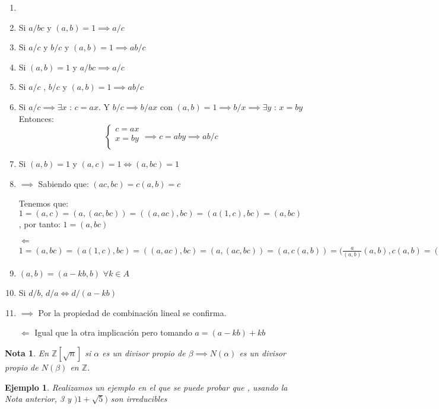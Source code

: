 \documentclass[11pt, a4paper, titlepage]{article}
\makeatletter
\renewenvironment{proof}[1][\proofname] {\vspace{-15pt}\par\pushQED{\qed}\normalfont\topsep6\p@\@plus6\p@\relax\trivlist\item[\hskip\labelsep\it#1\@addpunct{.}]\ignorespaces}{\popQED\endtrivlist\@endpefalse}
\theoremstyle{theorem-style}
\theoremstyle{definition-style}
\theoremstyle{remark-style}
\newtheorem*{nota}{Nota}
\theoremstyle{example-style}
\newtheorem*{ejemplo}{Ejemplo}
\newenvironment{nlist}
{\begin{enumerate}
\renewcommand\labelenumi{(\emph{\roman{enumi})}}}
{\end{enumerate}}
\makeatother
\begin{document}
\begin{nlist}
\begin{proof}
\end{proof}

\item Si $a/bc$ y $(a,b) = 1 \implies a/c$ 

\item Si $a/c$ y $b/c$ y $(a,b) = 1 \implies ab/c$
	\item Si $(a,b)=1 $ y $a/bc \implies a/c$
	\item Si $a/c$ , $b/c$ y $(a,b)=1 \implies ab/c$
	\item Si $a/c \implies \exists x$ : $c=ax$. Y $b/c \implies b/ax$ con $(a,b)=1 \implies b/x \implies \exists y$ : $x=by$
	Entonces: 
	\[
		\begin{cases}
			c=ax \\
			x=by \\
		\end{cases} \implies c=aby \implies ab/c
	\]
	\item Si $(a,b)=1$ y $(a,c)=1 \iff (a,bc)=1$ \\
	\begin{proof}
	$\boxed{\implies}$ Sabiendo que: $(ac,bc)=c(a,b)=c$
	
	Tenemos que: $1=(a,c)=(a,(ac,bc))=((a,ac),bc)=(a(1,c),bc)=(a,bc)$, por tanto: $1=(a,bc)$
	
	$\boxed{\Longleftarrow}$ $1=(a,bc)=(a(1,c),bc)=((a,ac),bc)=(a,(ac,bc))=(a,c(a,b))=(\frac{a}{(a,b)}(a,b),c(a,b)=(a,b)(\frac{a}{(a,b)},c)=1 \implies (a,b)\in U(A)\implies (a,b)=1\implies (a,c)\in U(A)\implies (a,c)=1$
\end{proof}
	\item $(a,b)=(a-kb,b)$ $\forall k \in A$
	\item Si $d/b$, $d/a \iff d/(a-kb)$ \\
	\begin{proof}
	$\boxed{\implies}$ Por la propiedad de combinación lineal se confirma.
	
	$\boxed{\Longleftarrow}$ Igual que la otra implicación pero tomando $a=(a-kb)+kb$
	\end{proof}
\end{nlist}

\begin{nota}
En $\mathbb{Z}[\sqrt{n}]$ si $\alpha$ es un divisor propio de $\beta \implies N(\alpha)$ es un divisor propio de $N(\beta)$ en $\mathbb{Z}$.
\end{nota}

\begin{ejemplo}
Realizamos un ejemplo en el que se puede probar que , usando la Nota anterior, 3 y $)1+\sqrt{5})$ son irreducibles	
\end{ejemplo}
\end{document}
